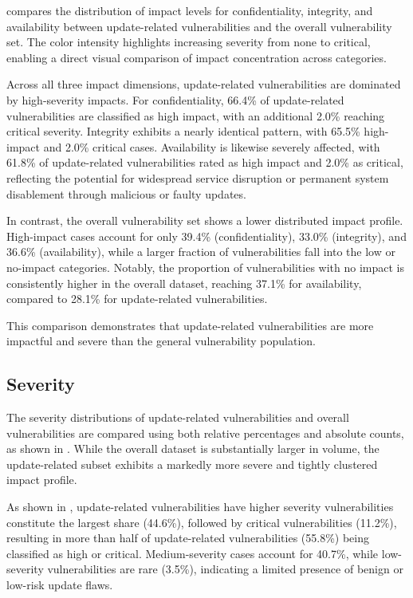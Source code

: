\documentclass[fleqn,s1,names,tex]{neptune}
\begin{document}
 compares the distribution of impact levels for confidentiality, integrity, and availability between update-related vulnerabilities and the overall vulnerability set. The color intensity highlights increasing severity from none to critical, enabling a direct visual comparison of impact concentration across categories.


Across all three impact dimensions, update-related vulnerabilities are dominated by high-severity impacts. 
For confidentiality, 66.4\% of update-related vulnerabilities are classified as high impact, with an additional 2.0\% reaching critical severity. 
Integrity exhibits a nearly identical pattern, with 65.5\% high-impact and 2.0\% critical cases. Availability is likewise severely affected, with 61.8\% of update-related vulnerabilities rated as high impact and 2.0\% as critical, reflecting the potential for widespread service disruption or permanent system disablement through malicious or faulty updates.

In contrast, the overall vulnerability set shows a lower distributed impact profile. 
High-impact cases account for only 39.4\% (confidentiality), 33.0\% (integrity), and 36.6\% (availability), while a larger fraction of vulnerabilities fall into the low or no-impact categories.
Notably, the proportion of vulnerabilities with no impact is consistently higher in the overall dataset, reaching 37.1\% for availability, compared to 28.1\% for update-related vulnerabilities.

This comparison demonstrates that update-related vulnerabilities are more  impactful and  severe than the general  vulnerability population.


\subsection{Severity}


The severity distributions of update-related vulnerabilities and overall vulnerabilities are compared using both relative percentages and absolute counts, as shown in  .
While the overall dataset is substantially larger in volume, the update-related subset exhibits a markedly more severe and tightly clustered impact profile.


As shown in  , update-related vulnerabilities have higher severity vulnerabilities constitute the largest share (44.6\%), followed by critical vulnerabilities (11.2\%), resulting in more than half of update-related vulnerabilities (55.8\%) being classified as high or critical. Medium-severity cases account for 40.7\%, while low-severity vulnerabilities are rare (3.5\%), indicating a limited presence of benign or low-risk update flaws.
\end{document}
